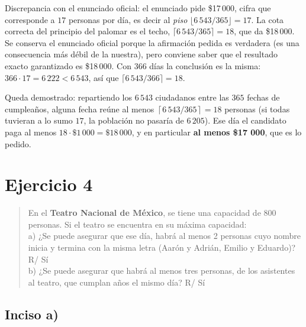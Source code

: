\documentclass[11pt]{article}
\begin{document}
\begin{nota}
Discrepancia con el enunciado oficial: el enunciado pide \$17\,000, cifra que corresponde a $17$ personas por día, es decir al \emph{piso} $\lfloor 6\,543/365\rfloor = 17$. La cota correcta del principio del palomar es el techo, $\lceil 6\,543/365\rceil = 18$, que da \$18\,000. Se conserva el enunciado oficial porque la afirmación pedida es verdadera (es una consecuencia más débil de la nuestra), pero conviene saber que el resultado exacto garantizado es \$18\,000. Con $366$ días la conclusión es la misma: $366\cdot 17=6\,222<6\,543$, así que $\lceil 6\,543/366\rceil=18$.
\end{nota}

\begin{resp}
Queda demostrado: repartiendo los $6\,543$ ciudadanos entre las $365$ fechas de cumpleaños, alguna fecha reúne al menos $\left\lceil 6\,543/365\right\rceil=18$ personas (si todas tuvieran a lo sumo $17$, la población no pasaría de $6\,205$). Ese día el candidato paga al menos $18\cdot\$1\,000=\$18\,000$, y en particular \textbf{al menos \$17 000}, que es lo pedido.
\end{resp}

\section*{Ejercicio 4}

\begin{quote}
En el \textbf{Teatro Nacional de México}, se tiene una capacidad de 800 personas. Si el teatro se encuentra en su máxima capacidad:\\
a) ¿Se puede asegurar que ese día, habrá al menos 2 personas cuyo nombre inicia y termina con la misma letra (Aarón y Adrián, Emilio y Eduardo)? \hfill R/ Sí\\
b) ¿Se puede asegurar que habrá al menos tres personas, de los asistentes al teatro, que cumplan años el mismo día? \hfill R/ Sí
\end{quote}

\subsection*{Inciso a)}
\end{document}
